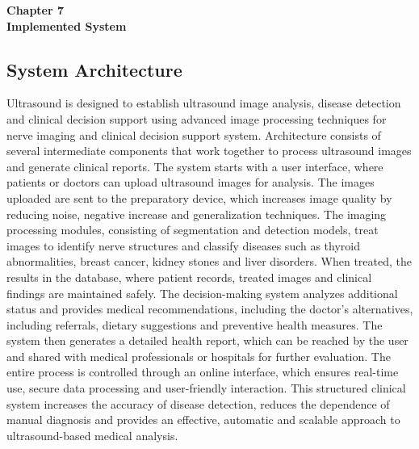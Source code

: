 \documentclass[12pt]{article}
\begin{document}
\setcounter{page}{40}


\vspace*{\fill}
\begin{center}
    {\Large \bf Chapter 7} \\[1em] %
    {\Large \bf Implemented System}
\end{center}
\vspace*{\fill}

\newpage

\vspace{15pt} %

\setcounter{section}{7}

\newpage

\subsection{System Architecture}

\vspace{10pt}

\noindent Ultrasound is designed to establish ultrasound image analysis, disease detection and clinical decision support using advanced image processing techniques for nerve imaging and clinical decision
support system. Architecture consists of several intermediate components that work together to
process ultrasound images and generate clinical reports. The system starts with a user interface,
where patients or doctors can upload ultrasound images for analysis. The images uploaded are
sent to the preparatory device, which increases image quality by reducing noise, negative increase
and generalization techniques. The imaging processing modules, consisting of segmentation and
detection models, treat images to identify nerve structures and classify diseases such as thyroid
abnormalities, breast cancer, kidney stones and liver disorders. When treated, the results in the
database, where patient records, treated images and clinical findings are maintained safely. The
decision-making system analyzes additional status and provides medical recommendations, including the doctor’s alternatives, including referrals, dietary suggestions and preventive health
measures. The system then generates a detailed health report, which can be reached by the user
and shared with medical professionals or hospitals for further evaluation. The entire process is
controlled through an online interface, which ensures real-time use, secure data processing and
user-friendly interaction. This structured clinical system increases the accuracy of disease detection, reduces the dependence of manual diagnosis and provides an effective, automatic and scalable
approach to ultrasound-based medical analysis.
\end{document}
